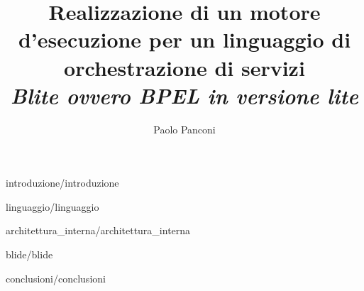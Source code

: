 \documentclass[a4paper,12pt]{book}
\begin{document}
\hyphenation{}
\sloppy

\title{\textsf{ \textbf{Realizzazione di un motore d'esecuzione per un
linguaggio di orchestrazione di servizi} \\ 
\em \large Blite ovvero BPEL in versione lite}\\ } 
\author{Paolo Panconi}

\maketitle


\tableofcontents

\listoffigures
\listoftables

%
%


%
{introduzione/introduzione}


%
{linguaggio/linguaggio}


%
{architettura_interna/architettura_interna}


%
{blide/blide}


%
{conclusioni/conclusioni}
\end{document}
